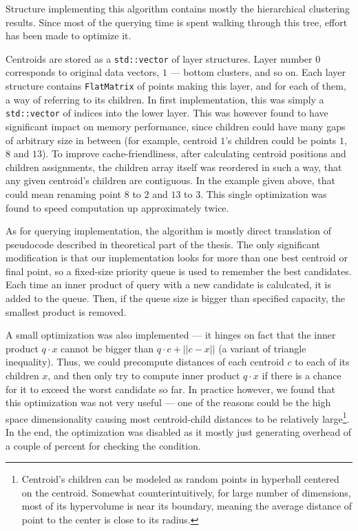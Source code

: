 Structure implementing this algorithm contains mostly the hierarchical clustering results.
Since most of the querying time is spent walking through this tree, effort has been made
to optimize it.

Centroids are stored as a \texttt{std::vector} of layer structures. Layer number $0$ corresponds
to original data vectors, $1$ --- bottom clusters, and so on. Each layer structure contains
\texttt{FlatMatrix} of points making this layer, and for each of them, a way of referring to
its children. In first implementation, this was simply a \texttt{std::vector} of indices into
the lower layer. This was however found to have significant impact on memory performance,
since children could have many gaps of arbitrary size in between (for example, centroid
$1$'s children could be points $1$, $8$ and $13$). To improve cache-friendliness, after
calculating centroid positions and children assignments, the children array itself was 
reordered in such a way, that any given centroid's children are contiguous. In the example
given above, that could mean renaming point $8$ to $2$ and $13$ to $3$. This single
optimization was found to speed computation up approximately twice.

As for querying implementation, the algorithm is mostly direct translation of pseudocode
described in theoretical part of the thesis. The only significant modification is 
that our implementation looks for more than one best centroid or final point, so a
fixed-size priority queue is used to remember the best candidates. Each time an inner
product of query with a new candidate is calulcated, it is added to the queue.
Then, if the queue size is bigger than specified capacity, the smallest product is
removed.

A small optimization was also implemented --- it hinges on fact that the inner product
$q \cdot x$ cannot be bigger than $q \cdot c + ||c - x||$ (a variant of triangle inequality).
Thus, we could precompute distances of each centroid $c$ to each of its children $x$,
and then only try to compute inner product $q \cdot x$ if there is a chance for 
it to exceed the worst candidate so far. In practice however, we found that this
optimization was not very useful --- one of the reasons could be the high space
dimensionality causing most centroid-child distances to be relatively large\footnote{
Centroid's children can be modeled as random points in hyperball centered on the
centroid. Somewhat counterintuitively, for large number of dimensions, 
most of its hypervolume is near its boundary, meaning the average distance of point
to the center is close to its radius.
}. In the end, the optimization was disabled as it mostly just generating overhead of a
couple of percent for checking the condition.
